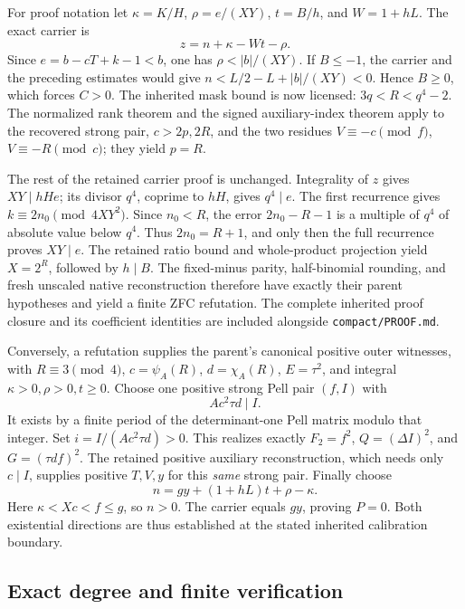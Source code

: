 For proof notation let
\(\kappa=K/H\), \(\rho=e/(XY)\), \(t=B/h\), and \(W=1+hL\).
The exact carrier is
\[
 z=n+\kappa-Wt-\rho.
\]
Since \(e=b-cT+k-1<b\), one has \(\rho<|b|/(XY)\).
If \(B\le-1\), the carrier and the preceding estimates would give
\(n<L/2-L+|b|/(XY)<0\). Hence \(B\ge0\), which forces \(C>0\).
The inherited mask bound is now licensed: \(3q<R<q^4-2\).
The normalized rank theorem and the signed auxiliary-index theorem
apply to the recovered strong pair, \(c>2p,2R\), and the two residues
\(V\equiv-c\pmod f\), \(V\equiv-R\pmod c\); they yield \(p=R\).

The rest of the retained carrier proof is unchanged. Integrality of \(z\)
gives \(XY\mid hHe\); its divisor \(q^4\), coprime to \(hH\), gives
\(q^4\mid e\). The first recurrence gives
\(k\equiv2n_0\pmod{4XY^2}\). Since \(n_0<R\), the error
\(2n_0-R-1\) is a multiple of \(q^4\) of absolute value below \(q^4\).
Thus \(2n_0=R+1\), and only then the full recurrence proves
\(XY\mid e\). The retained ratio bound and whole-product projection
yield \(X=2^R\), followed by \(h\mid B\). The fixed-minus parity,
half-binomial rounding, and fresh unscaled native reconstruction therefore
have exactly their parent hypotheses and yield a finite ZFC refutation.
The complete inherited proof closure and its coefficient identities are
included alongside \texttt{compact/PROOF.md}.

Conversely, a refutation supplies the parent's canonical positive outer
witnesses, with \(R\equiv3\pmod4\), \(c=\psi_A(R)\),
\(d=\chi_A(R)\), \(E=\tau^2\), and integral
\(\kappa>0,\rho>0,t\ge0\). Choose one positive strong Pell pair
\((f,I)\) with
\[
 Ac^2\tau d\mid I.
\]
It exists by a finite period of the determinant-one Pell matrix modulo
that integer. Set \(i=I/(Ac^2\tau d)>0\). This realizes exactly
\(F_2=f^2\), \(Q=(\Delta I)^2\), and \(G=(\tau df)^2\).
The retained positive auxiliary reconstruction, which needs only
\(c\mid I\), supplies positive \(T,V,y\) for this \emph{same} strong
pair. Finally choose
\[
 n=gy+(1+hL)t+\rho-\kappa.
\]
Here \(\kappa<Xc<f\le g\), so \(n>0\). The carrier equals \(gy\),
proving \(P=0\). Both existential directions are thus established at
the stated inherited calibration boundary.

\subsection{Exact degree and finite verification}

